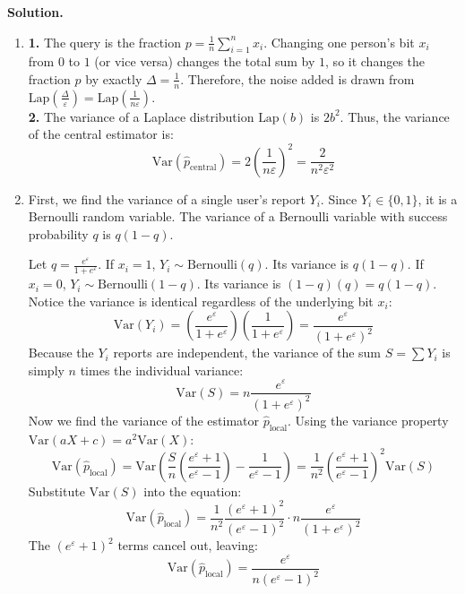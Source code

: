 \documentclass[12pt]{article}
\begin{document}
\begin{enumerate}
\begin{solution}
\textbf{Solution.}\\
\begin{enumerate}
\item 
\textbf{1.} The query is the fraction $p = \frac{1}{n} \sum_{i=1}^n x_i$. Changing one person's bit $x_i$ from $0$ to $1$ (or vice versa) changes the total sum by $1$, so it changes the fraction $p$ by exactly $\Delta = \frac{1}{n}$.
Therefore, the noise added is drawn from $\text{Lap}\left( \frac{\Delta}{\varepsilon} \right) = \text{Lap}\left( \frac{1}{n\varepsilon} \right)$. \\
\textbf{2.} The variance of a Laplace distribution $\text{Lap}(b)$ is $2b^2$. Thus, the variance of the central estimator is:
\[
\text{Var}(\hat{p}_{\text{central}}) = 2 \left( \frac{1}{n\varepsilon} \right)^2 = \frac{2}{n^2 \varepsilon^2}
\]

\item 
First, we find the variance of a single user's report $Y_i$. Since $Y_i \in \{0, 1\}$, it is a Bernoulli random variable. The variance of a Bernoulli variable with success probability $q$ is $q(1-q)$. 

Let $q = \frac{e^\varepsilon}{1 + e^\varepsilon}$. 
If $x_i = 1$, $Y_i \sim \text{Bernoulli}(q)$. Its variance is $q(1-q)$.
If $x_i = 0$, $Y_i \sim \text{Bernoulli}(1-q)$. Its variance is $(1-q)(q) = q(1-q)$.
Notice the variance is identical regardless of the underlying bit $x_i$:
\[
\text{Var}(Y_i) = \left( \frac{e^\varepsilon}{1 + e^\varepsilon} \right) \left( \frac{1}{1 + e^\varepsilon} \right) = \frac{e^\varepsilon}{(1 + e^\varepsilon)^2}
\]
Because the $Y_i$ reports are independent, the variance of the sum $S = \sum Y_i$ is simply $n$ times the individual variance:
\[
\text{Var}(S) = n \frac{e^\varepsilon}{(1 + e^\varepsilon)^2}
\]
Now we find the variance of the estimator $\hat{p}_{\text{local}}$. Using the variance property $\text{Var}(aX + c) = a^2 \text{Var}(X)$:
\[
\text{Var}(\hat{p}_{\text{local}}) = \text{Var}\left( \frac{S}{n} \left( \frac{e^\varepsilon + 1}{e^\varepsilon - 1} \right) - \frac{1}{e^\varepsilon - 1} \right) = \frac{1}{n^2} \left( \frac{e^\varepsilon + 1}{e^\varepsilon - 1} \right)^2 \text{Var}(S)
\]
Substitute $\text{Var}(S)$ into the equation:
\[
\text{Var}(\hat{p}_{\text{local}}) = \frac{1}{n^2} \frac{(e^\varepsilon + 1)^2}{(e^\varepsilon - 1)^2} \cdot n \frac{e^\varepsilon}{(1 + e^\varepsilon)^2}
\]
The $(e^\varepsilon + 1)^2$ terms cancel out, leaving:
\[
\text{Var}(\hat{p}_{\text{local}}) = \frac{e^\varepsilon}{n (e^\varepsilon - 1)^2}
\]


\end{enumerate}
\end{solution}
\end{enumerate}
\end{document}
